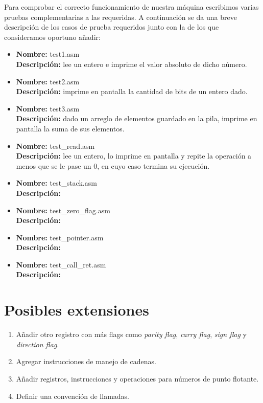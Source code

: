 \documentclass[a4paper,12pt]{article}
\begin{document}
Para comprobar el correcto funcionamiento de nuestra m\'aquina escribimos varias pruebas complementarias a las requeridas. A continuaci\'on se da una breve descripci\'on de los casos de prueba requeridos junto con la de los que consideramos oportuno añadir:
\begin{itemize}
\item
\textbf{Nombre:} test1.asm\\
\textbf{Descripción:} lee un entero e imprime el valor absoluto de dicho número.
\item
\textbf{Nombre:} test2.asm\\
\textbf{Descripción:} imprime en pantalla la cantidad de bits de un entero dado.
\item
\textbf{Nombre:} test3.asm\\
\textbf{Descripción:} dado un arreglo de elementos guardado en la pila, imprime en pantalla la suma de sus elementos.
\item
\textbf{Nombre:} test\_read.asm\\
\textbf{Descripción:} lee un entero, lo imprime en pantalla y repite la operación a menos que se le pase un 0, en cuyo caso termina su ejecuci\'on.
\item
\textbf{Nombre:} test\_stack.asm\\
\textbf{Descripción:}
\item
\textbf{Nombre:} test\_zero\_flag.asm\\
\textbf{Descripción:}
\item
\textbf{Nombre:} test\_pointer.asm\\
\textbf{Descripción:}
\item
\textbf{Nombre:} test\_call\_ret.asm\\
\textbf{Descripción:}
\end{itemize}

\section{Posibles extensiones}

\begin{enumerate}
\item Añadir otro registro con m\'as flags como \emph{parity flag}, \emph{carry flag}, \emph{sign flag} y \emph{direction flag}.
\item Agregar instrucciones de manejo de cadenas.
\item Añadir registros, instrucciones y operaciones para n\'umeros de punto flotante.
\item Definir una convención de llamadas.
\end{enumerate}
\end{document}
